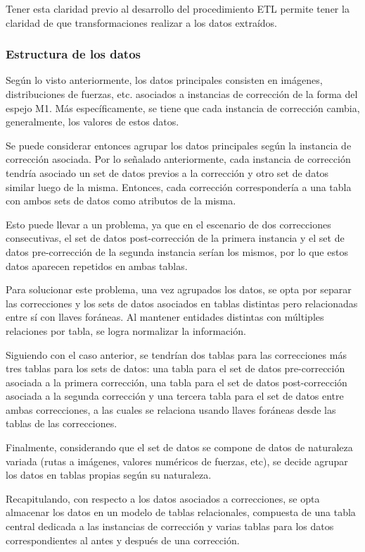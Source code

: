 Tener esta claridad previo al desarrollo del procedimiento ETL permite tener la claridad de que transformaciones realizar a los datos extraídos.

\subsubsection{Estructura de los datos}

Según lo visto anteriormente, los datos principales consisten en imágenes, distribuciones de fuerzas, etc. asociados a instancias de corrección de la forma del espejo M1. Más específicamente, se tiene que cada instancia de corrección cambia, generalmente, los valores de estos datos. 

Se puede considerar entonces agrupar los datos principales según la instancia de corrección asociada. Por lo señalado anteriormente, cada instancia de corrección tendría asociado un set de datos previos a la corrección y otro set de datos similar luego de la misma. Entonces, cada corrección correspondería a una tabla con ambos sets de datos como atributos de la misma.

Esto puede llevar a un problema, ya que en el escenario de dos correcciones consecutivas, el set de datos post-corrección de la primera instancia y el set de datos pre-corrección de la segunda instancia serían los mismos, por lo que estos datos aparecen repetidos en ambas tablas.

Para solucionar este problema, una vez agrupados los datos, se opta por separar las correcciones y los sets de datos asociados en tablas distintas pero relacionadas entre sí con llaves foráneas. Al mantener entidades distintas con múltiples relaciones por tabla, se logra normalizar la información.

Siguiendo con el caso anterior, se tendrían dos tablas para las correcciones más tres tablas para los sets de datos: una tabla para el set de datos pre-corrección asociada a la primera corrección, una tabla para el set de datos post-corrección asociada a la segunda corrección y una tercera tabla para el set de datos entre ambas correcciones, a las cuales se relaciona usando llaves foráneas desde las tablas de las correcciones.

Finalmente, considerando que el set de datos se compone de datos de naturaleza variada (rutas a imágenes, valores numéricos de fuerzas, etc), se decide agrupar los datos en tablas propias según su naturaleza.

Recapitulando, con respecto a los datos asociados a correcciones, se opta almacenar los datos en un modelo de tablas relacionales, compuesta de una tabla central dedicada a las instancias de corrección y varias tablas para los datos correspondientes al antes y después de una corrección.

